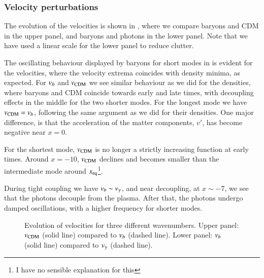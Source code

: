 \subsubsection{Velocity perturbations}\label{sssec:M3:results:velocity_perturbations}
The evolution of the velocities is shown in , where we compare baryons and CDM in the upper panel, and baryons and photons in the lower panel. Note that we have used a linear scale for the lower panel to reduce clutter.   

The oscillating behaviour displayed by baryons for short modes in  is evident for the velocities, where the velocity extrema coincides with density minima, as expected. For $v_b$ and $v_\mathrm{CDM}$ we see similar behaviour as we did for the densities, where baryons and CDM coincide towards early and late times, with decoupling effects in the middle for the two shorter modes. For the longest mode we have $v_\mathrm{CDM}=v_b$, following the same argument as we did for their densities. One major difference, is that the acceleration of the matter components, $v'$, has become negative near $x=0$. 

For the shortest mode, $v_\mathrm{CDM}$ is no longer a strictly increasing function at early times. Around $x=-10$, $v_\mathrm{CDM}$ declines and becomes smaller than the intermediate mode around $x_\mathrm{eq}$\footnote{I have no sensible explanation for this}.

During tight coupling we have $v_b\sim v_\gamma$, and near decoupling, at $x\sim-7$, we see that the photons decouple from the plasma. After that, the photons undergo damped oscillations, with a higher frequency for shorter modes. 

\begin{figure}[ht!]
    \caption{Evolution of velocities for three different wavenumbers. Upper panel: $v_\mathrm{CDM}$ (solid line) compared to $v_b$ (dashed line). Lower panel: $v_b$ (solid line) compared to $v_\gamma$ (dashed line).}
    \label{fig:M3:results:vels}
\end{figure}


